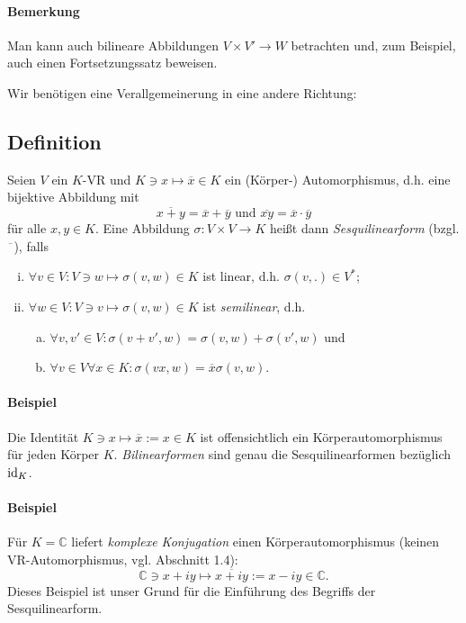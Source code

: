 \paragraph{Bemerkung}
	Man kann auch bilineare Abbildungen $ V\times V'\to W $ betrachten und, zum Beispiel, auch einen Fortsetzungssatz beweisen.
	
	Wir benötigen eine Verallgemeinerung in eine andere Richtung:
\subsection{Definition} 
\begin{Definition}[Sesquilinearform]
Seien $ V $ ein $ K $-VR und $ K\ni x\mapsto \overline{x}\in K $ ein (Körper-) Automorphismus, d.h. eine bijektive Abbildung mit
		\[ \overline{x+y} = \overline{x}+\overline{y} \text{ und } \overline{xy} = \overline{x}\cdot \overline{y} \]
	für alle $ x,y\in K $. Eine Abbildung $ \sigma: V\times V \to K $ heißt dann \emph{Sesquilinearform} (bzgl. $ \overline{\phantom{a}} $), falls
		\begin{enumerate}[(i)]
			\item $ \forall v\in V: V\ni w \mapsto \sigma(v,w)\in K $ ist linear, d.h. $ \sigma(v,.)\in V^* $;
			\item $ \forall w\in V: V\ni v \mapsto \sigma(v,w)\in K $ ist \emph{semilinear}, d.h.
				\begin{enumerate}[(a)]
					\item $ \forall v,v' \in V: \sigma(v+v',w) = \sigma(v,w)+\sigma(v',w) $ und
					\item $ \forall v\in V\forall x\in K: \sigma(vx,w) = \overline{x}\sigma(v,w) $.
				\end{enumerate}
		\end{enumerate}
\end{Definition}

\paragraph{Beispiel}
	Die Identität $ K\ni x\mapsto \overline{x}:= x\in K $ ist offensichtlich ein Körperautomorphismus für jeden Körper $ K $. \emph{Bilinearformen} sind genau die Sesquilinearformen bezüglich $ \operatorname{id}_K $.
\paragraph{Beispiel}
	Für $ K = \mathbb{C} $ liefert \emph{komplexe Konjugation} einen Körperautomorphismus (keinen VR-Automorphismus, vgl. Abschnitt 1.4):
		\[ \mathbb{C}\ni x+iy \mapsto \overline{x+iy}:= x-iy \in \mathbb{C}. \]
	Dieses Beispiel ist unser Grund für die Einführung des Begriffs der Sesquilinearform.
